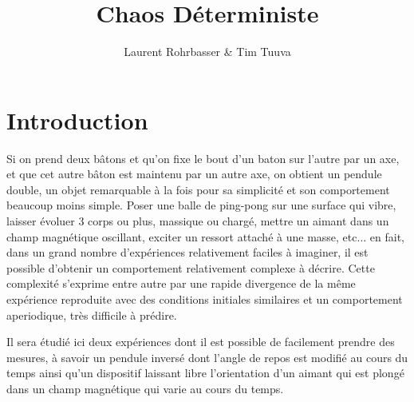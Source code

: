 \documentclass[a4paper,12pt,oneside]{article}
\begin{document}
\title{Chaos Déterministe}
\author{Laurent Rohrbasser \& Tim Tuuva}

\maketitle
\tableofcontents
\baselineskip=16pt
\parindent=15pt
\parskip=5pt


\newpage

\section{Introduction}
Si on prend deux bâtons et qu'on fixe le bout d'un baton sur l'autre par un axe, et que cet autre bâton est maintenu par un autre axe, on obtient un pendule double, un objet remarquable à la fois pour sa simplicité et son comportement beaucoup moins simple. Poser une balle de ping-pong sur une surface qui vibre, laisser évoluer 3 corps ou plus, massique ou chargé, mettre un aimant dans un champ magnétique oscillant, exciter un ressort attaché à une masse, etc... en fait, dans un grand nombre d'expériences relativement faciles à imaginer, il est possible d'obtenir un comportement relativement complexe à décrire. Cette complexité s'exprime entre autre par une rapide divergence de la même expérience reproduite avec des conditions initiales similaires et un comportement aperiodique, très difficile à prédire.

Il sera étudié ici deux expériences dont il est possible de facilement prendre des mesures, à savoir un pendule inversé dont l'angle de repos est modifié au cours du temps ainsi qu'un dispositif laissant libre l'orientation d'un aimant qui est plongé dans un champ magnétique qui varie au cours du temps.

\end{document}
